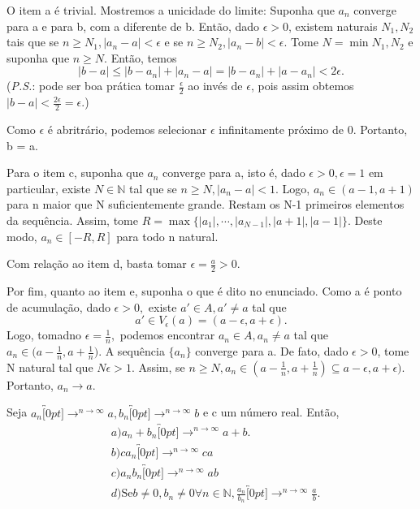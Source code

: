 \documentclass[Analysis/analysis_notes.tex]{subfiles}
\begin{document}
\begin{proof*}
	O item a \'e trivial. Mostremos a unicidade do limite: Suponha que $a_{n}$ converge para a e para b, com a diferente de b. Ent\~ao,
	dado $\epsilon > 0$, existem naturais $N_{1}, N_{2}$ tais que se $n\geq{N_{1}}, |a_{n}-a|<\epsilon$ e se $n\geq{N_{2}}, |a_{n} - b| < \epsilon.$
	Tome $N = \min{N_{1}, N_{2}}$ e suponha que $n \geq{N}.$ Ent\~ao, temos
	$$
		|b - a| \leq{|b - a_{n}| + |a_{n} - a|} = |b - a_{n}| + |a - a_{n}| < 2\epsilon.
	$$
	(\textit{P.S.}: pode ser boa pr\'atica tomar $\frac{\epsilon}{2}$ ao inv\'es de $\epsilon$, pois assim obtemos $|b-a|<\frac{2\epsilon}{2}=\epsilon.$)

	Como $\epsilon$ \'e abritr\'ario, podemos selecionar $\epsilon$ infinitamente pr\'oximo de 0. Portanto, b = a.

	Para o item c, suponha que $a_{n}$ converge para a, isto \'e, dado $\epsilon > 0, \epsilon = 1$ em particular, existe
	$N\in \mathbb{N}$ tal que se $n \geq{N}, |a_{n} - a| < 1$. Logo, $a_{n}\in(a - 1, a + 1)$ para n maior que N suficientemente grande.
	Restam os N-1 primeiros elementos da sequ\^encia. Assim, tome $R = \max{\biggl\{|a_{1}|, \cdots, |a_{N-1}|, |a + 1|, |a - 1|\biggr\}}$. Deste modo,
	$a_{n}\in[-R, R]$ para todo n natural.

	Com rela\c c\~ao ao item d, basta tomar $\epsilon = \frac{a}{2} > 0.$

	Por fim, quanto ao item e, suponha o que \'e dito no enunciado. Como a \'e ponto de acumula\c c\~ao, dado $\epsilon > 0,$ existe
	$a'\in{A}, a'\neq a$ tal que
	$$
		a'\in V_{\epsilon}(a) = (a - \epsilon, a + \epsilon).
	$$
	Logo, tomadno $\epsilon = \frac{1}{n},$ podemos encontrar $a_{n}\in A, a_{n}\neq a$ tal que $a_{n}\in\biggl(a-\frac{1}{n}, a + \frac{1}{n}\biggr)$. A sequ\^encia
	$\{a_{n}\}$ converge para a. De fato, dado $\epsilon > 0$, tome N natural tal que $N\epsilon > 1.$ Assim, se $n\geq{N}, a_{n}\in(a-\frac{1}{n}, a+\frac{1}{n})\subseteq{a-\epsilon}, a+\epsilon)$.
	Portanto, $a_{n}\rightarrow a.$ \qedsymbol
\end{proof*}
\begin{theorem*}
	Seja $a_{n}\overbracket[0pt]{\longrightarrow}^{n\to\infty}a, b_{n}\overbracket[0pt]{\rightarrow}^{n\to\infty}b$ e c um n\'umero real. Ent\~ao,
	\begin{align*}
		 & a) a_{n} + b_{n}\overbracket[0pt]{\longrightarrow}^{n\to\infty} a + b.                                                                \\
		 & b) ca_{n}\overbracket[0pt]{\longrightarrow}^{n\to\infty} ca                                                                           \\
		 & c) a_{n}b_{n}\overbracket[0pt]{\longrightarrow}^{n\to\infty} ab                                                                       \\
		 & d)\text{Se} b\neq0, b_{n}\neq0\forall n\in \mathbb{N}, \frac{a_{n}}{b_{n}}\overbracket[0pt]{\longrightarrow}^{n\to\infty}\frac{a}{b}.
	\end{align*}
\end{theorem*}
\end{document}
